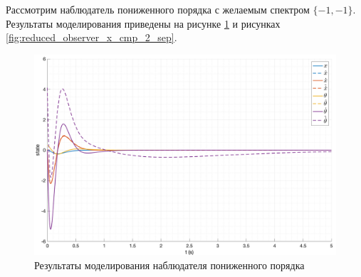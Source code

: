 Рассмотрим наблюдатель пониженного порядка с желаемым спектром $\{-1, -1\}$.
Результаты моделирования приведены на рисунке \ref{fig:reduced_observer_x_2} и рисунках \ref{fig:reduced_observer_x_cmp_2_sep}.
\begin{figure}[ht!]
    \centering
    \includegraphics[width=\textwidth]{media/plots/reduced_observer/reduced_observer_cmp_2.png}
    \caption{Результаты моделирования наблюдателя пониженного порядка}
    \label{fig:reduced_observer_x_2}
\end{figure}
